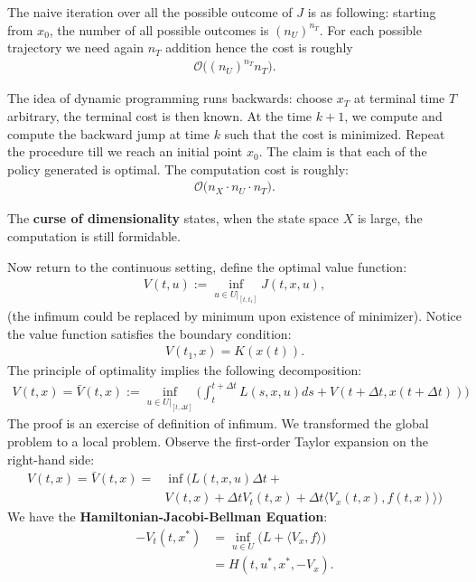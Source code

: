 The naive iteration over all the possible outcome of $J$ is as following: starting from  $x_0$, the number of all possible outcomes is $(n_U)^{n_T}$. For each possible trajectory we need again $n_T$ addition hence the cost is roughly
\begin{align*}
	\mathcal{O} \bigg( (n_U)^{n_T} n_T \bigg).
\end{align*}

The idea of dynamic programming runs backwards: choose $x_T$ at terminal time $T$ arbitrary, the terminal cost is then known. At the time $k + 1$, we compute and compute the backward jump at time $k$ such that the cost is minimized. Repeat the procedure till we reach an initial point $x_0$. The claim is that each of the policy generated is optimal. The computation cost is roughly:
\begin{align*}
	\mathcal{O}\bigg( n_X \cdot  n_U \cdot n_T \bigg).
\end{align*}

The \textbf{curse of dimensionality} states, when the state space $X$ is large, the computation is still formidable.\par 
\quad\par 
Now return to the continuous setting, define the optimal value function:
\begin{align*}
	V(t, u):= \inf_{u \in U|_{[t, t_1]}} J(t, x, u),
\end{align*}
(the infimum could be replaced by minimum upon existence of minimizer). Notice the value function satisfies the boundary condition:
\begin{align*}
	V(t_1, x) = K(x(t)).
\end{align*}
The principle of optimality implies the following decomposition: 
\begin{align*}
	V(t, x) = \bar{V}(t, x) := \inf_{u \in U|_{[t, \Delta t]}} \bigg( \int_{t}^{t + \Delta t} L(s, x, u) ds + V(t + \Delta t, x(t + \Delta t)) \bigg)
\end{align*}
The proof is an exercise of definition of infimum. We transformed the global problem to a local problem. Observe the first-order Taylor expansion on the right-hand side:
\begin{align*}
	V(t, x) = \bar{V}(t, x) = &\inf \bigg(L(t, x, u) \Delta t +   \\ &V(t, x) + \Delta t V_t(t, x) + \Delta t \langle V_x(t, x),  f(t, x) \rangle \bigg)  
\end{align*} 
We have the \textbf{Hamiltonian-Jacobi-Bellman Equation}:
\begin{align*}
	-V_t(t, x^*) &= \inf_{u \in U} \bigg(L + \langle V_x , f \rangle\bigg)\\
	&=  H(t, u^*, x^*, - V_x).
\end{align*}

